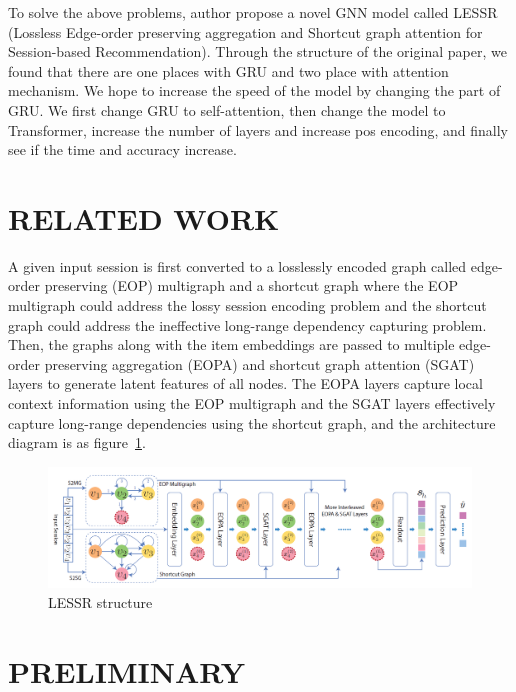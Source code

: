 \documentclass{article}
\begin{document}
To solve the above problems, author propose a novel GNN model called
LESSR (Lossless Edge-order preserving aggregation
and Shortcut graph attention for Session-based Recommendation)\cite{chen2020lessr}.
Through the structure of the original paper,
we found that there are one places with GRU and two place with attention mechanism.
We hope to increase the speed of the model by changing the part of GRU.
We first change GRU to self-attention\cite{vaswani2017attention},
then change the model to Transformer\cite{vaswani2017attention},
increase the number of layers and increase pos encoding,
and finally see if the time and accuracy increase.



\section{RELATED WORK}

A given input session is first converted to a losslessly encoded graph
called edge-order preserving (EOP) multigraph and a shortcut graph
where the EOP multigraph could address the lossy session encoding
problem and the shortcut graph could address
the ineffective long-range dependency capturing problem.
Then, the graphs along with the item embeddings are passed
to multiple edge-order preserving aggregation (EOPA)
and shortcut graph attention (SGAT) layers
to generate latent features of all nodes.
The EOPA layers capture local context information using the EOP multigraph
and the SGAT layers effectively capture long-range dependencies using
the shortcut graph, and the architecture diagram is as figure~\ref{fig:lessr}.

\begin{figure}
    \centering
    \includegraphics[scale=0.35]{lessr}
    \caption{LESSR structure}
    \label{fig:lessr}
\end{figure}




\section{PRELIMINARY}
\end{document}
